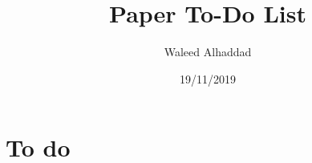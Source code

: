 \documentclass[12pt]{article}
\begin{document}
\title{Paper To-Do List}
\author{Waleed Alhaddad}
\date{19/11/2019}
\maketitle



\section{To do}
\end{document}
